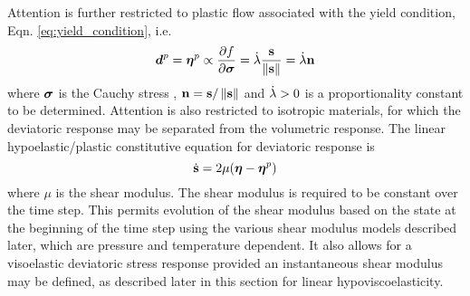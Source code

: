 Attention is further restricted to plastic flow associated with the yield condition,
Eqn. \ref{eq:yield_condition}, i.e.
  \begin{equation}\label{eq:associated_flow}
    \boldsymbol{d}^p = \boldsymbol{\eta}^p \propto \frac{\displaystyle\partial f}{\displaystyle\partial \boldsymbol{\sigma}} = \dot{\lambda}{\mathbf{s}\over\left\lVert\mathbf{s}\right\rVert} = \dot{\lambda}\mathbf{n}
  \end{equation}
where $\boldsymbol{\sigma}$ is the Cauchy stress , $\mathbf{n}={\mathbf{s}/\left\lVert\mathbf{s}\right\rVert}$ and
$\dot{\lambda}>0$ is a proportionality constant to be determined.
Attention is also restricted to isotropic materials, for which the
deviatoric response may be separated from the volumetric response.
The linear hypoelastic/plastic constitutive equation for deviatoric
response is
  \begin{equation}\label{eq:linearhypoelasticity}
    \dot{\mathbf{s}} = 2\mu(\boldsymbol{\eta} - \boldsymbol{\eta}^p)
  \end{equation}
where $\mu$ is the shear modulus.  The shear modulus is required to be
constant over the time step.  This permits evolution of the shear
modulus based on the state at the beginning of the time step using the
various shear modulus models described later, which are pressure and
temperature dependent.  It also allows for a visoelastic deviatoric
stress response provided an instantaneous shear modulus may be
defined, as described later in this section for linear
hypoviscoelasticity.

